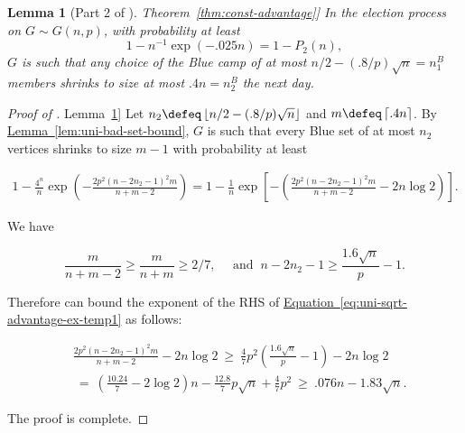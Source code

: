 \documentclass[11pt]{article}
\numberwithin{equation}{section}
\newtheorem{lemma}[theorem]{Lemma}
\theoremstyle{definition}
\theoremstyle{plain}
\newcommand{\expref}[2]{\hyperref[#2]{#1~\ref{#2}}}
\newcommand{\expeqref}[2]{\hyperref[#2]{#1~\eqref{#2}}}
\begin{document}
			\begin{lemma}[Part 2 of \expref{Theorem}{thm:const-advantage}]  \label{prop:uni-sqrt-advantage-ex}
				In the election process on $G\sim G(n, p)$,
				with probability at least
				\begin{equation} \label{eq:uni-sqrt-advantage-ex}
					1 - n^{-1}\exp\left(- .025n \right) = 1 - P_2(n),
				\end{equation}
				$G$ is such that any choice of the Blue camp of at most $n/2 - (.8/p)\sqrt{n} = n_1^B$ members shrinks to size at most $.4n = n_2^B$ the next day.
			\end{lemma}
			
			\begin{proof}[Proof of \expref{Lemma}{prop:uni-sqrt-advantage-ex}]
				Let $n_2 \defeq \left\lfloor n/2 - (.8/p)\sqrt{n} \right\rfloor$ and $m \defeq \left\lceil .4n \right\rceil$.
				By \expref{Lemma}{lem:uni-bad-set-bound}, $G$ is such that every Blue set of at most $n_2$ vertices shrinks to size $m - 1$ with probability at least
				\begin{linenomath}\begin{equation*}  \label{eq:uni-sqrt-advantage-ex-temp1}
						\begin{aligned}
							1 - \frac{4^n}{n} \exp \left(- \frac{2p^2(n - 2n_2 - 1)^2m}{n + m -2} \right)
							= 1 - \frac{1}{n} \exp \left[- \left(\frac{2p^2(n - 2n_2 - 1)^2m}{n + m -2} - 2n \log 2\right)\right].
						\end{aligned}
				\end{equation*}\end{linenomath}
				We have
				\begin{linenomath}\begin{equation*}
						\frac{m}{n + m - 2} \ge \frac{m}{n + m} \ge 2/7, \quad \text{ and } \ n - 2n_2 - 1 \ge \frac{1.6\sqrt{n}}{p} - 1.
				\end{equation*}\end{linenomath}
				Therefore can bound the exponent of the RHS of \expeqref{Equation}{eq:uni-sqrt-advantage-ex-temp1} as follows:
				\begin{linenomath}\begin{equation*}
						\begin{aligned}
							& \frac{2p^2(n - 2n_2 - 1)^2m}{n + m -2} - 2n \log 2
							\ \ge \ \frac{4}{7}p^2\left(\frac{1.6\sqrt{n}}{p} - 1 \right) - 2n\log 2 \\
							& \ = \ \left(\frac{10.24}{7} - 2\log 2\right)n - \frac{12.8}{7}p\sqrt{n} + \frac{4}{7}p^2 \ \ge \ .076n - 1.83\sqrt{n}.
						\end{aligned}
				\end{equation*}\end{linenomath}
				The proof is complete.
			\end{proof}
			
\end{document}
